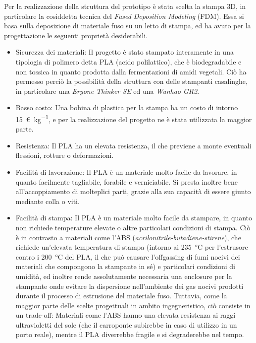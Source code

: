Per la realizzazione della struttura del prototipo è stata scelta la stampa 3D, in
particolare la cosiddetta tecnica del \emph{Fused Deposition Modeling} (FDM). Essa si basa sulla
deposizione di materiale fuso su un letto di stampa, ed ha avuto per la progettazione le seguenti proprietà desiderabili.
\begin{itemize}
    \item Sicurezza dei materiali: Il progetto è stato stampato interamente in una tipologia di
        polimero detta PLA (acido polilattico), che è biodegradabile e non tossica in quanto
        prodotta dalla fermentazioni di amidi vegetali. Ciò ha permesso perciò la possibilità della
        struttura con delle stampanti casalinghe, in particolare una \emph{Eryone Thinker SE} ed una
        \emph{Wunhao GR2}.
    \item Basso costo: Una bobina di plastica per la stampa ha un costo di intorno
        \qty{15}{\euro\per\kg}, e per la realizzazione del progetto ne è stata utilizzata la maggior
        parte.
    \item Resistenza: Il PLA ha un elevata resistenza, il che previene a monte eventuali flessioni,
        rotture o deformazioni.
    \item Facilità di lavorazione: Il PLA è un materiale molto facile da lavorare, in quanto
        facilmente tagliabile, forabile e verniciabile. Si presta inoltre bene all'accoppiamento di
        molteplici parti, grazie alla sua capacità di essere giunto mediante colla o viti.
    \item Facilità di stampa: Il PLA è un materiale molto facile da stampare, in quanto non richiede
        temperature elevate o altre particolari condizioni di stampa. Ciò è in contrasto a materiali
        come l'ABS (\emph{acrilonitrile-butadiene-stirene}), che richiede un'elevata temperatura di
        stampa (intorno ai \qty{235}{\degreeCelsius} per l'estrusore contro i
        \qty{200}{\degreeCelsius} del PLA, il che può causare l'offgassing di fumi nocivi dei
        materiali che compongono la stampante in sé) e particolari condizioni di umidità, ed inoltre
        rende assolutamente necessaria una enclosure per la stampante onde evitare la dispersione
        nell'ambiente dei gas nocivi prodotti durante il processo di estrusione del materiale fuso.
        Tuttavia, come la maggior parte delle scelte progettuali in ambito ingegneristico, ciò
        consiste in un trade-off: Materiali come l'ABS hanno una elevata resistenza ai raggi
        ultravioletti del sole (che il carroponte subirebbe in caso di utilizzo in un porto reale),
        mentre il PLA diverrebbe fragile e si degraderebbe nel tempo.
\end{itemize}

